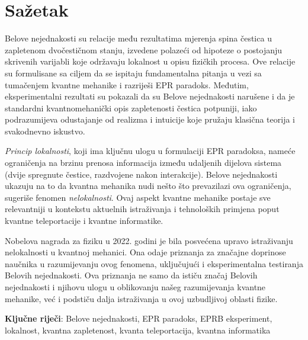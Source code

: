 \chapter*{Sažetak}
\sloppy

Belove nejednakosti su relacije među rezultatima mjerenja spina čestica u zapletenom dvočestičnom stanju, izvedene polazeći od hipoteze o postojanju skrivenih varijabli koje održavaju lokalnost u opisu fizičkih procesa.
Ove relacije su formulisane sa ciljem da se ispitaju fundamentalna pitanja u vezi sa tumačenjem kvantne mehanike i razriješi EPR paradoks.
Međutim, eksperimentalni rezultati su pokazali da su Belove nejednakosti narušene i da je standardni kvantnomehanički opis zapletenosti čestica potpuniji, iako podrazumijeva odustajanje od realizma i intuicije
koje pružaju klasična teorija i svako\-dnevno iskustvo.

{\it{Princip lokalnosti}}, koji ima ključnu ulogu u formulaciji EPR paradoksa,
nameće ograničenja na brzinu prenosa informacija između udaljenih dijelova sistema (dvije spregnute čestice, razdvojene nakon interakcije). Belove nejednakosti ukazuju na to da kvantna mehanika nudi nešto što prevazilazi ova ograničenja, sugeriše fenomen {\it{nelokalnosti}}. Ovaj aspekt kvantne mehanike postaje sve relevantniji u kontekstu aktuelnih istraživanja i tehnoloških primjena poput kvantne teleportacije i kvantne informatike.

Nobelova nagrada za fiziku u 2022. godini je bila posvećena upravo istraživanju nelokalnosti u kvantnoj mehanici. Ona odaje priznanja za značajne doprinose naučnika u razumijevanju ovog fenomena, uključujući i eksperimentalna testiranja Belovih nejednakosti. Ova priznanja ne samo da ističu značaj Belovih nejednakosti i njihovu ulogu u oblikovanju našeg razumijevanja kvantne mehanike, već i podstiču dalja istraživanja u ovoj uzbudljivoj oblasti fizike.

{\textbf{Ključne riječi}}: Belove nejednakosti, EPR paradoks, EPRB eksperiment, lokalnost, kvantna zapletenost, kvanta teleportacija, kvantna informatika